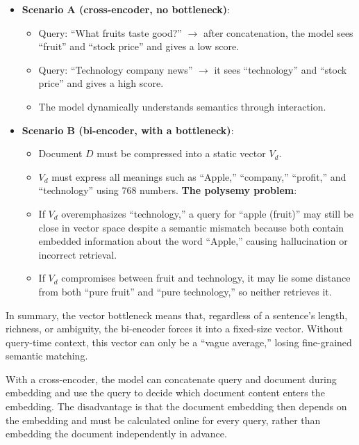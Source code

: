 \begin{itemize}
\tightlist
\item
{}
  \textbf{Scenario A (cross-encoder, no bottleneck)}:

  \begin{itemize}
  \tightlist
  \item
    Query: ``What fruits taste good?'' \(\to\) after concatenation, the model sees ``fruit'' and ``stock price'' and gives a low score.
  \item
    Query: ``Technology company news'' \(\to\) it sees ``technology'' and ``stock price'' and gives a high score.
  \item
    The model dynamically understands semantics through interaction.
  \end{itemize}
\item
{}
  \textbf{Scenario B (bi-encoder, with a bottleneck)}:

  \begin{itemize}
  \tightlist
  \item
    Document \(D\) must be compressed into a static vector \(V_d\).
  \item
{}
    \(V_d\) must express all meanings such as ``Apple,'' ``company,'' ``profit,'' and ``technology'' using 768 numbers. \textbf{The polysemy problem}:
  \item
    If \(V_d\) overemphasizes ``technology,'' a query for ``apple (fruit)'' may still be close in vector space despite a semantic mismatch because both contain embedded information about the word ``Apple,'' causing hallucination or incorrect retrieval.
  \item
    If \(V_d\) compromises between fruit and technology, it may lie some distance from both ``pure fruit'' and ``pure technology,'' so neither retrieves it.
  \end{itemize}
\end{itemize}

In summary, the vector bottleneck means that, regardless of a sentence's length, richness, or ambiguity, the bi-encoder forces it into a fixed-size vector. Without query-time context, this vector can only be a ``vague average,'' losing fine-grained semantic matching.

With a cross-encoder, the model can concatenate query and document during embedding and use the query to decide which document content enters the embedding. The disadvantage is that the document embedding then depends on the embedding and must be calculated online for every query, rather than embedding the document independently in advance.

